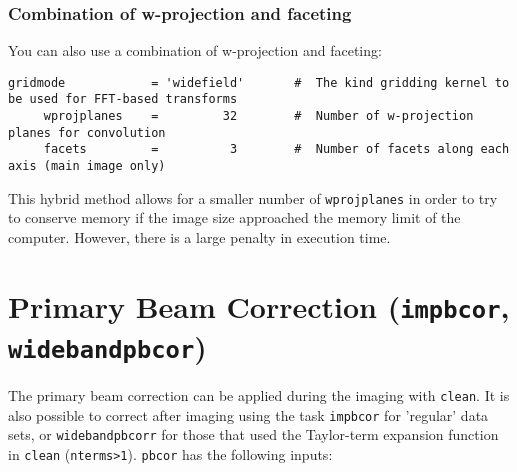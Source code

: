 \subsubsection{Combination of w-projection and faceting}
\label{section:im.clean.widefield.combo}

You can also use a combination of w-projection and faceting:
\small
\begin{verbatim}
gridmode            = 'widefield'       #  The kind gridding kernel to be used for FFT-based transforms
     wprojplanes    =         32        #  Number of w-projection planes for convolution
     facets         =          3        #  Number of facets along each axis (main image only)
\end{verbatim}
\normalsize
This hybrid method allows for a smaller number of {\tt wprojplanes} in order
to try to conserve memory if the image size approached the memory limit
of the computer.  However, there is a large penalty in execution time.


\section{Primary Beam Correction ({\tt impbcor}, {\tt widebandpbcor})}
\label{section:im.impbcor}


The primary beam correction can be applied during the imaging with
{\tt clean}. It is also possible to correct after imaging using the
task {\tt impbcor} for 'regular' data sets, or {\tt widebandpbcorr}
for those that used the Taylor-term expansion function in {\tt clean}
({\tt nterms>1}). {\tt pbcor} has the following inputs:

